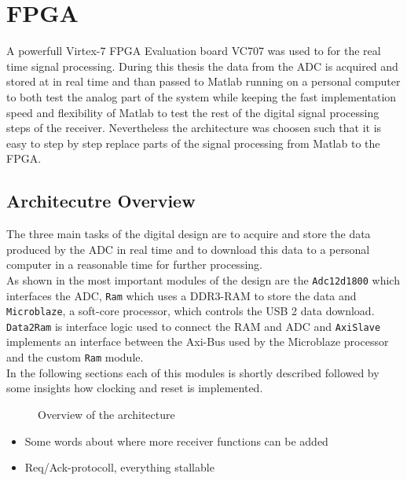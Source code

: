 \chapter{FPGA}
A powerfull Virtex-7 \gls{FPGA} Evaluation board VC707
was used to for the real time signal processing.
During this thesis the data from the \gls{ADC} is acquired and stored at in real
time and than passed to Matlab running on a personal computer to both test
the analog part of the system while keeping the fast implementation speed
and flexibility of Matlab to test the rest of the digital signal processing steps
of the receiver. Nevertheless the architecture was choosen such that it is easy
to step by step replace parts of the signal processing from Matlab to the
\gls{FPGA}.

\section{Architecutre Overview}
The three main tasks of the digital design are to acquire and store the data
produced by the \gls{ADC} in real time and to download this data to a
personal computer in a reasonable time for further processing. \\

As shown in  the most important
modules of the design are the \verb|Adc12d1800| which interfaces the
\gls{ADC}, \verb|Ram| which uses a DDR3-\gls{RAM} to store the data
and \verb|Microblaze|, a soft-core processor, which controls the
\gls{USB} 2 data download. \verb|Data2Ram| is interface logic used
to connect the \gls{RAM} and \gls{ADC} and \verb|AxiSlave| implements
an interface between the Axi-Bus used by the Microblaze processor
and the custom \verb|Ram| module. \\

In the following sections each of this modules is shortly described followed
by some insights how clocking and reset is implemented.

\begin{figure}[ht]
  \centering
  \caption{Overview of the architecture}
  \label{fig:fpga_architecture_overview}
\end{figure}

\begin{itemize}
\item Some words about where more receiver functions can be added
\item Req/Ack-protocoll, everything stallable
\end{itemize}

